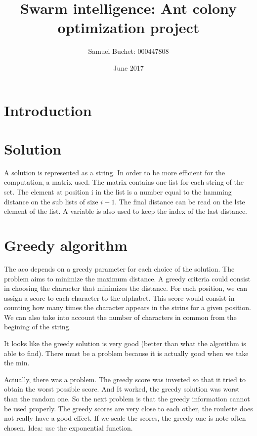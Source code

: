 \documentclass{article}
\title{Swarm intelligence: Ant colony optimization project}
\author{Samuel Buchet: 000447808}
\date{June 2017}
\begin{document}
\maketitle

\section{Introduction}

\section{Solution}

A solution is represented as a string.
In order to be more efficient for the computation, a matrix used.
The matrix contains one list for each string of the set.
The element at position i in the list is a number equal to the hamming distance
on the sub lists of size $i+1$.
The final distance can be read on the lste element of the list.
A variable is also used to keep the index of the last distance.

\section{Greedy algorithm}

The aco depends on a greedy parameter for each choice of the solution.
The problem aims to minimize the maximum distance.
A greedy criteria could consist in choosing the character that minimizes the distance.
For each position, we can assign a score to each character to the alphabet.
This score would consist in counting how many times the character appears in the strins for a given position.
We can also take into account the number of characters in common from the begining of the string. \newline

It looks like the greedy solution is very good (better than what the algorithm is able to find).
There must be a problem because it is actually good when we take the min. \newline

Actually, there was a problem.
The greedy score was inverted so that it tried to obtain the worst possible score.
And It worked, the greedy solution was worst than the random one.
So the next problem is that the greedy information cannot be used properly.
The greedy scores are very close to each other, the roulette does not really have a good effect.
If we scale the scores, the greedy one is note often chosen.
Idea: use the exponential function.
\end{document}
